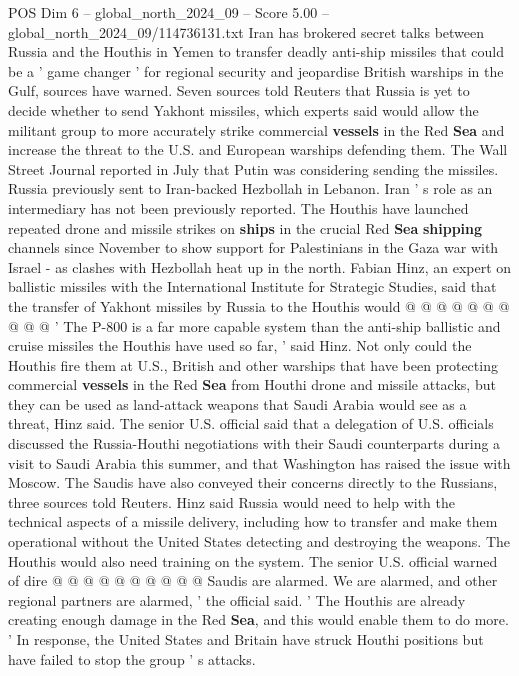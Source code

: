 \begin{textsample}{POS Dim 6 – global\_north\_2024\_09 – Score 5.00 – global\_north\_2024\_09/114736131.txt}  \label{ex:f6_pos_364}
Iran has brokered secret talks between Russia and the Houthis in Yemen to transfer deadly anti-ship missiles that could be a ' game changer ' for regional security and jeopardise British warships in the Gulf, sources have warned.
Seven sources told Reuters that Russia is yet to decide whether to send Yakhont missiles, which experts said would allow the militant group to more accurately strike commercial \textbf{vessels} in the Red \textbf{Sea} and increase the threat to the U.S. and European warships defending them.
The Wall Street Journal reported in July that Putin was considering sending the missiles.
Russia previously sent to Iran-backed Hezbollah in Lebanon.
Iran ' s role as an intermediary has not been previously reported.
The Houthis have launched repeated drone and missile strikes on \textbf{ships} in the crucial Red \textbf{Sea} \textbf{shipping} channels since November to show support for Palestinians in the Gaza war with Israel - as clashes with Hezbollah heat up in the north.
Fabian Hinz, an expert on ballistic missiles with the International Institute for Strategic Studies, said that the transfer of Yakhont missiles by Russia to the Houthis would @ @ @ @ @ @ @ @ @ @ ' The P-800 is a far more capable system than the anti-ship ballistic and cruise missiles the Houthis have used so far, ' said Hinz.
Not only could the Houthis fire them at U.S., British and other warships that have been protecting commercial \textbf{vessels} in the Red \textbf{Sea} from Houthi drone and missile attacks, but they can be used as land-attack weapons that Saudi Arabia would see as a threat, Hinz said.
The senior U.S. official said that a delegation of U.S. officials discussed the Russia-Houthi negotiations with their Saudi counterparts during a visit to Saudi Arabia this summer, and that Washington has raised the issue with Moscow.
The Saudis have also conveyed their concerns directly to the Russians, three sources told Reuters.
Hinz said Russia would need to help with the technical aspects of a missile delivery, including how to transfer and make them operational without the United States detecting and destroying the weapons.
The Houthis would also need training on the system.
The senior U.S. official warned of dire @ @ @ @ @ @ @ @ @ @ Saudis are alarmed.
We are alarmed, and other regional partners are alarmed, ' the official said. ' The Houthis are already creating enough damage in the Red \textbf{Sea}, and this would enable them to do more. ' In response, the United States and Britain have struck Houthi positions but have failed to stop the group ' s attacks.

\end{textsample}
